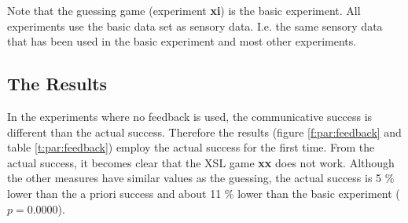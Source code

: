 Note that the guessing game (experiment {\bf xi}) is the basic experiment. All experiments use the basic data set as sensory data. I.e. the same sensory data that has been used in the basic experiment and most other experiments.

\subsection{The Results}


In the experiments where no feedback is used, the communicative success is different than the actual success. Therefore the results (figure \ref{f:par:feedback} and table \ref{t:par:feedback}) employ the actual success for the first time. From the actual success, it becomes clear that the XSL game {\bf xx} does not work. Although the other measures have similar values as the guessing, the actual success is 5 \% lower than the a priori success and about 11 \% lower than the basic experiment ($p=0.0000$).

